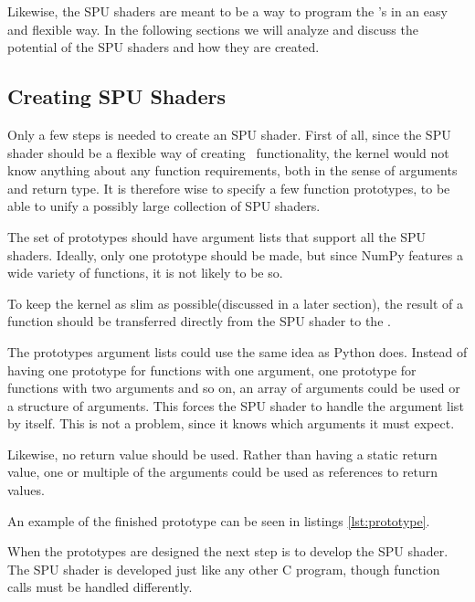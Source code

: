 Likewise, the SPU shaders are meant to be a way to program
the \SPU{}'s in an easy and flexible way. In the following sections we
will analyze and discuss the potential of the SPU shaders and how they
are created.



\subsection{Creating SPU Shaders}

Only a few steps is needed to create an SPU shader. First of all,
since the SPU shader should be a flexible way of creating \SPE\
functionality, the kernel would not know anything about any function
requirements, both in the sense of arguments and return type. It is
therefore wise to specify a few function prototypes, to be able to
unify a possibly large collection of SPU shaders.

The set of prototypes should have argument lists that support all the
SPU shaders. Ideally, only one prototype should be made, but since
NumPy features a wide variety of functions, it is not likely to be so.

To keep the kernel as slim as possible(discussed in a later section),
the result of a function should be transferred directly from the SPU
shader to the \PPE{}. 

The prototypes argument lists could use the same idea as Python
does. Instead of having one prototype for functions with one argument,
one prototype for functions with two arguments and so on, an array of
arguments could be used or a structure of arguments. This forces the
SPU shader to handle the argument list by itself. This is not a
problem, since it knows which arguments it must expect.

Likewise, no return value should be used. Rather than having a static
return value, one or multiple of the arguments could be used as
references to return values.

An example of the finished prototype can be seen in
listings \ref{lst:prototype}.\\


When the prototypes are designed the next step is to develop the SPU
shader. The SPU shader is developed just like any other C program,
though function calls must be handled differently.

